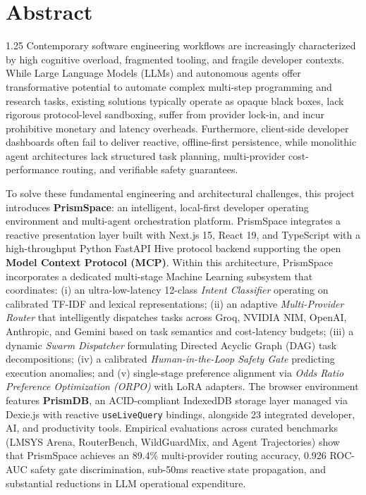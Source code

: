 \chapter*{Abstract}%
%
\vspace{-20pt}

\begin{spacing}{1.25}
\noindent Contemporary software engineering workflows are increasingly characterized by high cognitive overload, fragmented tooling, and fragile developer contexts. While Large Language Models (LLMs) and autonomous agents offer transformative potential to automate complex multi-step programming and research tasks, existing solutions typically operate as opaque black boxes, lack rigorous protocol-level sandboxing, suffer from provider lock-in, and incur prohibitive monetary and latency overheads. Furthermore, client-side developer dashboards often fail to deliver reactive, offline-first persistence, while monolithic agent architectures lack structured task planning, multi-provider cost-performance routing, and verifiable safety guarantees.

\vspace{8pt}

\noindent To solve these fundamental engineering and architectural challenges, this project introduces \textbf{PrismSpace}: an intelligent, local-first developer operating environment and multi-agent orchestration platform. PrismSpace integrates a reactive presentation layer built with Next.js 15, React 19, and TypeScript with a high-throughput Python FastAPI Hive protocol backend supporting the open \textbf{Model Context Protocol (MCP)}. Within this architecture, PrismSpace incorporates a dedicated multi-stage Machine Learning subsystem that coordinates: (i) an ultra-low-latency 12-class \textit{Intent Classifier} operating on calibrated TF-IDF and lexical representations; (ii) an adaptive \textit{Multi-Provider Router} that intelligently dispatches tasks across Groq, NVIDIA NIM, OpenAI, Anthropic, and Gemini based on task semantics and cost-latency budgets; (iii) a dynamic \textit{Swarm Dispatcher} formulating Directed Acyclic Graph (DAG) task decompositions; (iv) a calibrated \textit{Human-in-the-Loop Safety Gate} predicting execution anomalies; and (v) single-stage preference alignment via \textit{Odds Ratio Preference Optimization (ORPO)} with LoRA adapters. The browser environment features \textbf{PrismDB}, an ACID-compliant IndexedDB storage layer managed via Dexie.js with reactive \texttt{useLiveQuery} bindings, alongside 23 integrated developer, AI, and productivity tools. Empirical evaluations across curated benchmarks (LMSYS Arena, RouterBench, WildGuardMix, and Agent Trajectories) show that PrismSpace achieves an 89.4\% multi-provider routing accuracy, 0.926 ROC-AUC safety gate discrimination, sub-50ms reactive state propagation, and substantial reductions in LLM operational expenditure.

\end{spacing}

\thispagestyle{plain}
